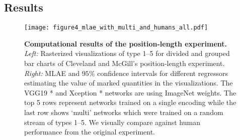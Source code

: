 % 
% 
%
%
%

\subsection{Results}

\begin{figure}[!t]
  \centering
    \texttt{[image: figure4\_mlae\_with\_multi\_and\_humans\_all.pdf]}
  \caption{\textbf{Computational results of the position-length experiment.} \textit{Left:} Rasterized visualizations of type 1--5 for divided and grouped bar charts of Cleveland and McGill's position-length experiment. \textit{Right:} MLAE and $95\%$ confidence intervals for different regressors estimating the value of marked quantities in the visualizations. The VGG19 * and Xception * networks are using ImageNet weights. The top 5 rows represent networks trained on a single encoding while the last row shows `multi' networks which were trained on a random stream of types 1--5. We visually compare against human performance from the original experiment.}
  \label{fig:figure4_mlae}
\end{figure}


